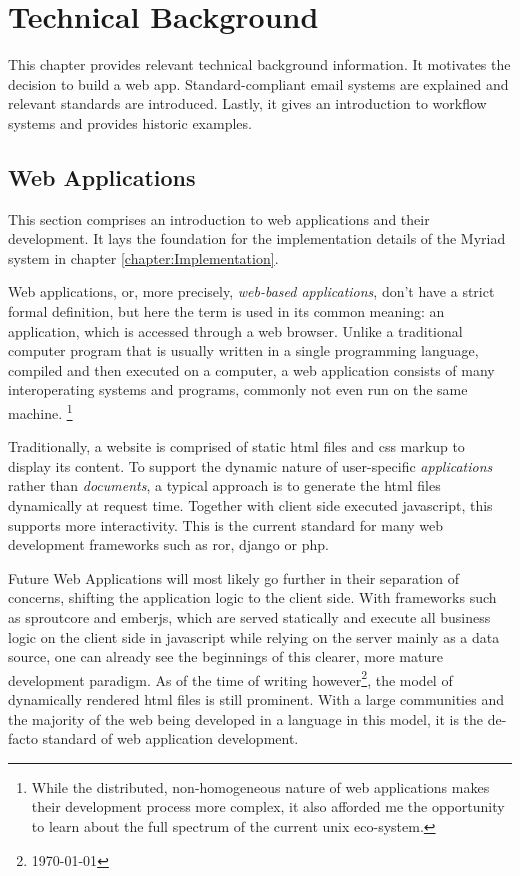 \chapter{Technical Background}
\label{chapter:Technical}

This chapter provides relevant technical background information. It motivates the decision to build a web app. Standard-compliant email systems are explained and relevant standards are introduced. Lastly, it gives an introduction to workflow systems and provides historic examples.

\section{Web Applications}

This section comprises an introduction to web applications and their development. It lays the foundation for the implementation details of the Myriad system in chapter \autoref{chapter:Implementation}.

Web applications, or, more precisely, \emph{web-based applications}, don't have a strict formal definition, but here the term is used in its common meaning\citep{webapptrends}: an application, which is accessed through a web browser. Unlike a traditional computer program that is usually written in a single programming language, compiled and then executed on a computer, a web application consists of many interoperating systems and programs, commonly not even run on the same machine. \footnote{While the distributed, non-homogeneous nature of web applications makes their development process more complex, it also afforded me the opportunity to learn about the full spectrum of the current unix eco-system.}

Traditionally, a website is comprised of static \gls{html} files and \gls{css} markup to display its content. To support the dynamic nature of user-specific \emph{applications} rather than \emph{documents}, a typical approach is to generate the \gls{html} files dynamically at request time. Together with client side executed \gls{javascript}, this supports more interactivity. This is the current standard for many web development frameworks such as \gls{ror}, \gls{django} or \gls{php}.

Future Web Applications will most likely go further in their separation of concerns, shifting the application logic to the client side. With frameworks such as \gls{sproutcore} and \gls{emberjs}, which are served statically and execute all business logic on the client side in \gls{javascript} while relying on the server mainly as a data source, one can already see the beginnings of this clearer, more mature development paradigm. As of the time of writing however\footnote{ \today }, the model of dynamically rendered \gls{html} files is still prominent. With a large communities and the majority of the web being developed in a language in this model\citep{builtwith}, it is the de-facto standard of web application development.

